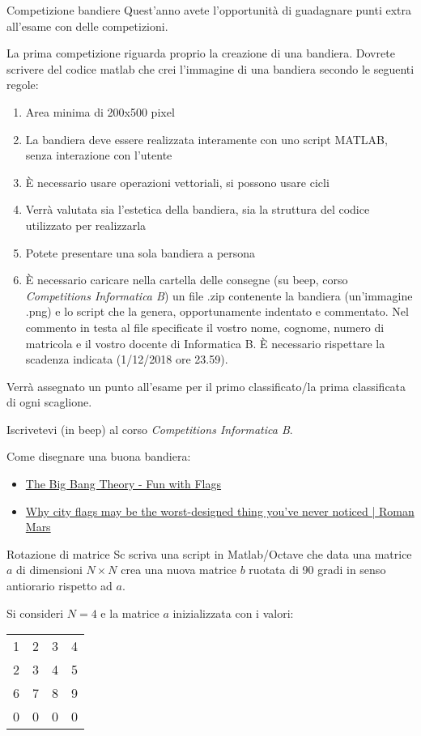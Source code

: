 \documentclass[format=169, handout]{beamer}
\begin{document}
\begin{frame}[allowframebreaks]{Competizione bandiere}
Quest'anno avete l'opportunità di guadagnare punti extra all'esame con delle competizioni.

La prima competizione riguarda proprio la creazione di una bandiera. Dovrete scrivere del codice matlab che crei l'immagine di una bandiera secondo le seguenti regole:
\begin{enumerate}
	\item Area minima di 200x500 pixel
	\item La bandiera deve essere realizzata interamente con uno script MATLAB, senza interazione con l'utente
	\item È necessario usare operazioni vettoriali, si possono usare cicli
	\item Verrà valutata sia l'estetica della bandiera, sia la struttura del codice utilizzato per realizzarla
	\item Potete presentare una sola bandiera a persona
	\item È necessario caricare nella cartella delle consegne (su beep, corso \emph{Competitions Informatica B}) un file .zip contenente la bandiera (un'immagine .png) e lo script che la genera, opportunamente indentato e commentato. Nel commento in testa al file specificate il vostro nome, cognome, numero di matricola e il vostro docente di Informatica B. È necessario rispettare la scadenza indicata (1/12/2018 ore 23.59).
\end{enumerate}

Verrà assegnato un punto all'esame per il primo classificato/la prima classificata di ogni scaglione.

Iscrivetevi (in beep) al corso \emph{Competitions Informatica B}.

Come disegnare una buona bandiera:
\begin{itemize}
\item \href{https://www.youtube.com/watch?v=BRNzeiV14bY}{The Big Bang Theory - Fun with Flags}
\item \href{https://www.youtube.com/watch?v=pnv5iKB2hl4}{Why city flags may be the worst-designed thing you've never noticed | Roman Mars}
\end{itemize}
\end{frame}

\begin{frame}{Rotazione di matrice}
Sc scriva una script in Matlab/Octave che data una matrice $a$ di dimensioni $N\times N$ crea una nuova matrice $b$ ruotata di 90 gradi in senso antiorario rispetto ad $a$.

Si consideri $N=4$ e la matrice $a$ inizializzata con i valori:

\centering
\begin{tabular}{|cccc|}
	\hline
	1&2&3&4\\
	2&3&4&5\\
	6&7&8&9\\
	0&0&0&0\\
	\hline
\end{tabular}
\end{frame}
\end{document}
